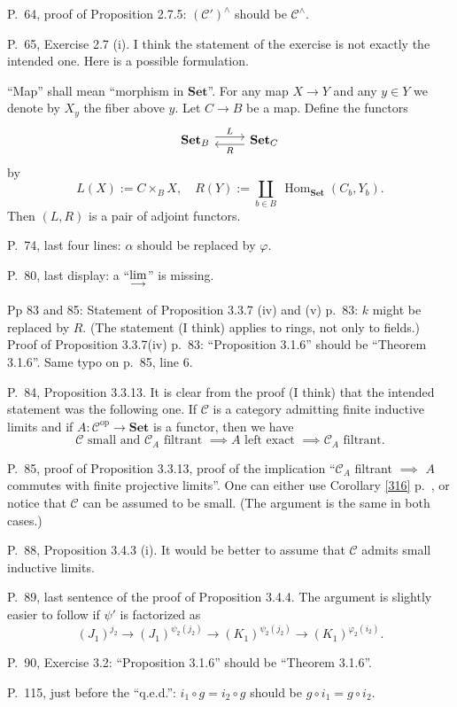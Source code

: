\documentclass[12pt]{article}
\theoremstyle{remark}
\theoremstyle{definition}
\newcommand{\n}{\noindent}
\newcommand{\C}{\mathcal C}
\newcommand{\Set}{\textbf{Set}}
\newcommand{\p}{\varphi}
\newcommand{\colim}{\operatornamewithlimits{\underset{\longrightarrow}{lim}}}
\DeclareMathOperator{\Hom}{Hom}
\DeclareMathOperator{\op}{op}
\begin{document}
\n P.~64, proof of Proposition 2.7.5: $(\C')^\wedge$ should be $\C^\wedge$. 

\n P.~65, Exercise 2.7 (i). I think the statement of the exercise is not exactly the intended one. Here is a possible formulation. 

``Map'' shall mean ``morphism in $\Set$''. For any map $X\to Y$ and any $y\in Y$ we denote by $X_y$ the fiber above $y$. Let $C\to B$ be a map. Define the functors 
$$
\begin{tikzcd}
\Set_B\ar[yshift=.7ex]{r}{L}&\Set_C\ar[yshift=-.7ex]{l}{R}
\end{tikzcd}
$$ 
by 
$$
L(X):=C\times_BX,\quad R(Y):=\coprod_{b\in B}\ \Hom_{\Set}(C_b,Y_b). 
$$ 
Then $(L,R)$ is a pair of adjoint functors. 

\n P.~74, last four lines: $\alpha$ should be replaced by $\varphi$. 

\n P.~80, last display: a ``$\displaystyle\colim$'' is missing.

\n Pp 83 and 85: Statement of Proposition 3.3.7 (iv) and (v) p.~83: $k$ might be replaced by $R$. (The statement (I think) applies to rings, not only to fields.) Proof of Proposition 3.3.7(iv) p.~83: ``Proposition 3.1.6'' should be ``Theorem 3.1.6''. Same typo on p.~85, line 6. 

\n P.~84, Proposition 3.3.13. It is clear from the proof (I think) that the intended statement was the following one. If $\C$ is a category admitting finite inductive limits and if $A:\C^{\op}\to\Set$ is a functor, then we have 
$$
\C\text{ small and }\C_A\text{ filtrant }\implies A\text{ left exact }\implies\C_A\text{ filtrant}.
$$

\n P.~85, proof of Proposition 3.3.13, proof of the implication ``$\C_A$ filtrant $\implies$ $A$ commutes with finite projective limits''. One can either use Corollary \ref{316} p.~\pageref{316}, or notice that $\C$ can be assumed to be small. (The argument is the same in both cases.) 

\n P.~88, Proposition 3.4.3 (i). It would be better to assume that $\C$ admits small inductive limits. 

\n P.~89, last sentence of the proof of Proposition 3.4.4. The argument is slightly easier to follow if $\psi'$ is factorized as 
$$
(J_1)^{j_2}\to(J_1)^{\psi_2(j_2)}\to(K_1)^{\psi_2(j_2)}\to(K_1)^{\p_2(i_2)}.
$$ 

\n P.~90, Exercise 3.2: ``Proposition 3.1.6'' should be ``Theorem 3.1.6''.

\n P.~115, just before the ``q.e.d.'': $i_1\circ g=i_2\circ g$ should be $g\circ i_1=g\circ i_2$. 
\end{document}
